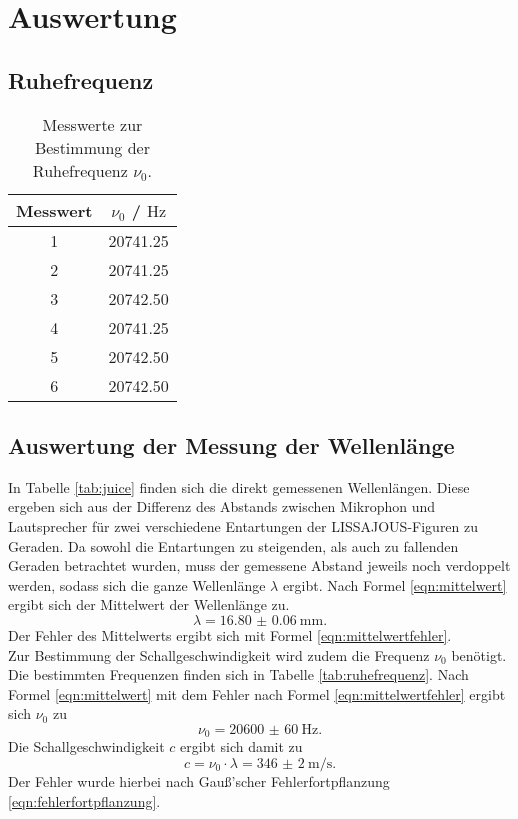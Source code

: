 \section{Auswertung}
\label{sec:Auswertung}
\FloatBarrier
\subsection{Ruhefrequenz}
\begin{table}
	\centering
	\caption{Messwerte zur Bestimmung der Ruhefrequenz $\nu_0$.}
	\label{tab:ruhefr}
	\begin{tabular}{cc}
		\toprule
		Messwert & $\nu_0$ / $\si{\hertz}$ \\
		\midrule
		1        & 20741.25                \\
		2        & 20741.25                \\
		3        & 20742.50                \\
		4        & 20741.25                \\
		5        & 20742.50                \\
		6        & 20742.50                \\
		\bottomrule
	\end{tabular}
\end{table}
\FloatBarrier
\subsection{Auswertung der Messung der Wellenlänge}
In Tabelle \ref{tab:juice} finden sich die direkt gemessenen Wellenlängen. Diese ergeben sich aus der Differenz des Abstands zwischen Mikrophon und Lautsprecher für zwei verschiedene Entartungen der LISSAJOUS-Figuren zu Geraden.
Da sowohl die Entartungen zu steigenden, als auch zu fallenden Geraden betrachtet wurden, muss der gemessene Abstand jeweils noch verdoppelt werden, sodass sich die ganze Wellenlänge $\lambda$ ergibt.
Nach Formel \eqref{eqn:mittelwert} ergibt sich der Mittelwert der Wellenlänge zu.
\begin{equation}
	\label{eqn:wellenlänge}
	\lambda=\SI{16.80(6)}{\milli\metre}\text{.}
\end{equation}
Der Fehler des Mittelwerts ergibt sich mit Formel \eqref{eqn:mittelwertfehler}.\\
Zur Bestimmung der Schallgeschwindigkeit wird zudem die Frequenz $\nu_{0}$ benötigt.
Die bestimmten Frequenzen finden sich in Tabelle \ref{tab:ruhefrequenz}.
Nach Formel \eqref{eqn:mittelwert} mit dem Fehler nach Formel \eqref{eqn:mittelwertfehler} ergibt sich $\nu_0$ zu
\begin{equation}
	\label{eqn:rrrruhe}
	\nu_0=\SI{20600(60)}{\Hz}\text{.}
\end{equation}
Die Schallgeschwindigkeit $c$ ergibt sich damit zu
\begin{equation}
	\label{eqn:Schallgeschwindigkeit}
	c=\nu_0 \cdot\lambda=\SI{346(2)}{\meter\per\second}\text{.}
\end{equation}
Der Fehler wurde hierbei nach Gauß'scher Fehlerfortpflanzung \eqref{eqn:fehlerfortpflanzung}.

